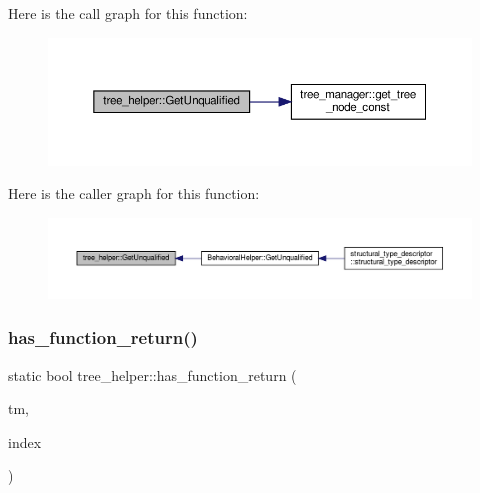 Here is the call graph for this function\+:
\nopagebreak
\begin{figure}[H]
\begin{center}
\leavevmode
\includegraphics[width=350pt]{d7/d99/classtree__helper_ad16dad59416cc21add3fbf84adeef1b4_cgraph}
\end{center}
\end{figure}
Here is the caller graph for this function\+:
\nopagebreak
\begin{figure}[H]
\begin{center}
\leavevmode
\includegraphics[width=350pt]{d7/d99/classtree__helper_ad16dad59416cc21add3fbf84adeef1b4_icgraph}
\end{center}
\end{figure}
\mbox{\label{classtree__helper_a8de4381897b7cae4b997fad4f254bb1b}} 
\subsubsection{\texorpdfstring{has\+\_\+function\+\_\+return()}{has\_function\_return()}}
{\footnotesize\ttfamily static bool tree\+\_\+helper\+::has\+\_\+function\+\_\+return (\begin{DoxyParamCaption}\item[{const \hyperlink{tree__manager_8hpp_a792e3f1f892d7d997a8d8a4a12e39346}{tree\+\_\+manager\+Const\+Ref}}]{tm,  }\item[{const unsigned int}]{index }\end{DoxyParamCaption})\hspace{0.3cm}{\ttfamily [static]}}



